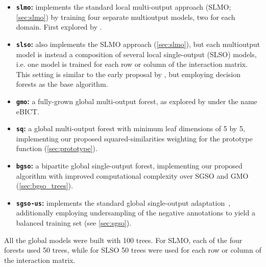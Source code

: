 \begin{itemize}
    \item \textbf{\texttt{slmo}:} implements the standard local multi-output approach (SLMO; \autoref{sec:slmo}) by training four separate multioutput models, two for each domain. First explored by .
    \item \textbf{\texttt{slso}:} also implements the SLMO approach (\autoref{sec:slmo}), but each multioutput model is instead a composition of several local single-output (SLSO) models, i.e. one model is trained for each row or column of the interaction matrix. This setting is similar to the early proposal by , but employing decision forests as the base algorithm.
    \item \textbf{\texttt{gmo}:} a fully-grown global multi-output forest, as explored by  under the name eBICT.
    \item \textbf{\texttt{sq}:} a global multi-output forest with minimum leaf dimensions of 5 by 5, implementing our proposed squared-similarities weighting for the prototype function (\autoref{sec:prototype}). %
    \item \textbf{\texttt{bgso}:} a bipartite global single-output forest, implementing our proposed algorithm with improved computational complexity over SGSO and GMO (\autoref{sec:bgso_trees}).
    \item \textbf{\texttt{sgso-us}:} implements the standard global single-output adaptation~\cite{schrynemackers2015classifying}, additionally employing undersampling of the negative annotations to yield a balanced training set (see \autoref{sec:sgso}).  %
\end{itemize}

All the global models were built with 100 trees. For SLMO, each of the four forests used 50 trees, while for SLSO 50 trees were used for each row or column of the interaction matrix.

